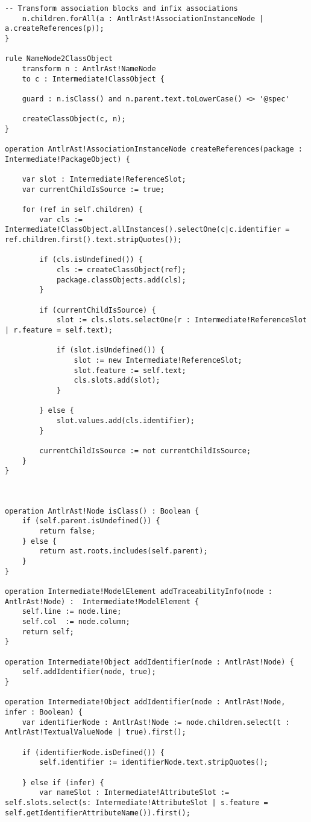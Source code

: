 \begin{lstlisting}[caption=Transforming AST models to intermediate models with ETL., label=lst:m2m_full, language=ETL]
	-- Transform association blocks and infix associations
	n.children.forAll(a : AntlrAst!AssociationInstanceNode | a.createReferences(p));
}

rule NameNode2ClassObject
	transform n : AntlrAst!NameNode
	to c : Intermediate!ClassObject {
	
	guard : n.isClass() and n.parent.text.toLowerCase() <> '@spec'
	
	createClassObject(c, n);
}

operation AntlrAst!AssociationInstanceNode createReferences(package : Intermediate!PackageObject) {

	var slot : Intermediate!ReferenceSlot;	
	var currentChildIsSource := true;
	
	for (ref in self.children) {
		var cls := Intermediate!ClassObject.allInstances().selectOne(c|c.identifier = ref.children.first().text.stripQuotes());
		
		if (cls.isUndefined()) {
			cls := createClassObject(ref);
			package.classObjects.add(cls);
		}
		
		if (currentChildIsSource) {
			slot := cls.slots.selectOne(r : Intermediate!ReferenceSlot | r.feature = self.text);
			
			if (slot.isUndefined()) {
				slot := new Intermediate!ReferenceSlot;
				slot.feature := self.text;
				cls.slots.add(slot);
			}
		
		} else {
			slot.values.add(cls.identifier);
		}
		
		currentChildIsSource := not currentChildIsSource;
	}
}



operation AntlrAst!Node isClass() : Boolean {
	if (self.parent.isUndefined()) {
		return false;
	} else {
		return ast.roots.includes(self.parent);
	}
}

operation Intermediate!ModelElement addTraceabilityInfo(node : AntlrAst!Node) :  Intermediate!ModelElement {
	self.line := node.line;
	self.col  := node.column;
	return self;
}

operation Intermediate!Object addIdentifier(node : AntlrAst!Node) {
	self.addIdentifier(node, true);
}

operation Intermediate!Object addIdentifier(node : AntlrAst!Node, infer : Boolean) {
	var identifierNode : AntlrAst!Node := node.children.select(t : AntlrAst!TextualValueNode | true).first();
	
	if (identifierNode.isDefined()) {
		self.identifier := identifierNode.text.stripQuotes();
	
	} else if (infer) {
		var nameSlot : Intermediate!AttributeSlot := self.slots.select(s: Intermediate!AttributeSlot | s.feature = self.getIdentifierAttributeName()).first();
		

\end{lstlisting}
